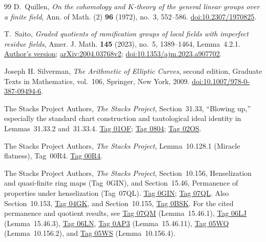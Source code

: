 \documentclass[11pt,a4paper]{amsart}
\numberwithin{equation}{section}
\theoremstyle{definition}
\theoremstyle{remark}
\begin{document}
\begin{thebibliography}{99}
D.~Quillen, \emph{On the cohomology and \(K\)-theory of the general
linear groups over a finite field}, Ann. of Math. (2)
\textbf{96} (1972), no.~3, 552--586.
\href{https://doi.org/10.2307/1970825}{doi:10.2307/1970825}.

T.~Saito, \emph{Graded quotients of ramification groups of local fields with imperfect residue fields}, Amer. J. Math. \textbf{145} (2023), no.~5, 1389--1464, Lemma~4.2.1.
\href{https://preprint.press.jhu.edu/ajm/sites/default/files/AJM-saito.pdf}{Author's version};
\href{https://arxiv.org/abs/2004.03768v2}{arXiv:2004.03768v2};
\href{https://doi.org/10.1353/ajm.2023.a907702}{doi:10.1353/ajm.2023.a907702}.

Joseph H. Silverman,
\emph{The Arithmetic of Elliptic Curves},
second edition, Graduate Texts in Mathematics, vol.~106,
Springer, New York, 2009.
\href{https://doi.org/10.1007/978-0-387-09494-6}{doi:10.1007/978-0-387-09494-6}.

The Stacks Project Authors, \emph{The Stacks Project}, Section~31.33, ``Blowing up,'' especially the standard chart construction and tautological ideal identity in Lemmas~31.33.2 and~31.33.4.
\href{https://stacks.math.columbia.edu/tag/01OF}{Tag 01OF};
\href{https://stacks.math.columbia.edu/tag/0804}{Tag 0804};
\href{https://stacks.math.columbia.edu/tag/02OS}{Tag 02OS}.

The Stacks Project Authors, \emph{The Stacks Project}, Lemma~10.128.1 (Miracle flatness), Tag~00R4.
\href{https://stacks.math.columbia.edu/tag/00R4}{Tag 00R4}.

The Stacks Project Authors, \emph{The Stacks Project}, Section~10.156, Henselization and quasi-finite ring maps (Tag~0GIN), and Section~15.46, Permanence of properties under henselization (Tag~07QL).
\href{https://stacks.math.columbia.edu/tag/0GIN}{Tag 0GIN}; \href{https://stacks.math.columbia.edu/tag/07QL}{Tag 07QL}. Also Section~10.153, \href{https://stacks.math.columbia.edu/tag/04GK}{Tag 04GK}, and Section~10.155, \href{https://stacks.math.columbia.edu/tag/0BSK}{Tag 0BSK}.
For the cited permanence and quotient results, see
\href{https://stacks.math.columbia.edu/tag/07QM}{Tag 07QM}
(Lemma~15.46.1),
\href{https://stacks.math.columbia.edu/tag/06LJ}{Tag 06LJ}
(Lemma~15.46.3),
\href{https://stacks.math.columbia.edu/tag/06LN}{Tag 06LN},
\href{https://stacks.math.columbia.edu/tag/0AP3}{Tag 0AP3}
(Lemma~15.46.11),
\href{https://stacks.math.columbia.edu/tag/05WQ}{Tag 05WQ}
(Lemma~10.156.2), and
\href{https://stacks.math.columbia.edu/tag/05WS}{Tag 05WS}
(Lemma~10.156.4).


\end{thebibliography}
\end{document}
